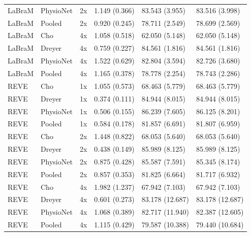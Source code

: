 \begin{longtable}{llllll}
LaBraM & PhysioNet & 2x & 1.149 (0.366) & 83.543 (3.955) & 83.516 (3.998) \\
LaBraM & Pooled & 2x & 0.920 (0.245) & 78.711 (2.549) & 78.699 (2.569) \\
LaBraM & Cho & 4x & 1.058 (0.518) & 62.050 (5.148) & 62.050 (5.148) \\
LaBraM & Dreyer & 4x & 0.759 (0.227) & 84.561 (1.816) & 84.561 (1.816) \\
LaBraM & PhysioNet & 4x & 1.522 (0.629) & 82.804 (3.594) & 82.726 (3.680) \\
LaBraM & Pooled & 4x & 1.165 (0.378) & 78.778 (2.254) & 78.743 (2.286) \\
REVE & Cho & 1x & 1.055 (0.573) & 68.463 (5.779) & 68.463 (5.779) \\
REVE & Dreyer & 1x & 0.374 (0.111) & 84.944 (8.015) & 84.944 (8.015) \\
REVE & PhysioNet & 1x & 0.506 (0.155) & 86.239 (7.605) & 86.125 (8.201) \\
REVE & Pooled & 1x & 0.584 (0.178) & 81.857 (6.691) & 81.807 (6.959) \\
REVE & Cho & 2x & 1.448 (0.822) & 68.053 (5.640) & 68.053 (5.640) \\
REVE & Dreyer & 2x & 0.438 (0.149) & 85.989 (8.125) & 85.989 (8.125) \\
REVE & PhysioNet & 2x & 0.875 (0.428) & 85.587 (7.591) & 85.345 (8.174) \\
REVE & Pooled & 2x & 0.857 (0.353) & 81.825 (6.664) & 81.717 (6.932) \\
REVE & Cho & 4x & 1.982 (1.237) & 67.942 (7.103) & 67.942 (7.103) \\
REVE & Dreyer & 4x & 0.601 (0.273) & 83.178 (12.687) & 83.178 (12.687) \\
REVE & PhysioNet & 4x & 1.068 (0.389) & 82.717 (11.940) & 82.387 (12.605) \\
REVE & Pooled & 4x & 1.115 (0.429) & 79.587 (10.388) & 79.440 (10.684) \\
\bottomrule
\end{longtable}
